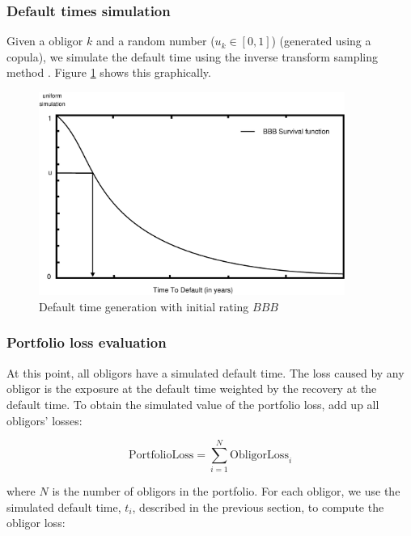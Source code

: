 \documentclass[a4paper,12pt,final]{article}
\begin{document}
\subsubsection{Default times simulation}
\label{sec:deftimessim}
Given a obligor $k$ and a random number ($u_k \in [0,1]$) (generated using a 
copula), we simulate the default time using the inverse transform sampling
method \cite{ref:cred_risk}. Figure \ref{simttd} shows this graphically.

\begin{figure}[!hbt]
\begin{center}
\includegraphics[width=10cm,angle=0]{./images/simttd.eps}
\caption{Default time generation with initial rating $BBB$}
\label{simttd}
\end{center}
\end{figure}
\FloatBarrier

\subsubsection{Portfolio loss evaluation}
\label{sec:portfolioloss}
At this point, all obligors have a simulated default time. The loss
caused by any obligor is the exposure at the default time weighted by 
the recovery at the default time. To obtain the simulated value of the 
portfolio loss, add up all obligors' losses:

\begin{displaymath}
\mathrm{PortfolioLoss} = \sum_{i=1}^N \mathrm{ObligorLoss}_i
\end{displaymath}

where $N$ is the number of obligors in the portfolio. For each obligor, we 
use the simulated default time, $t_i$, described in the previous section, to 
compute the obligor loss:
\end{document}
